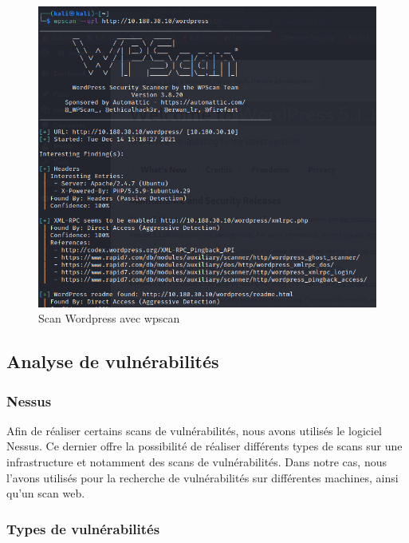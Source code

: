 \documentclass[french,paper=a4,oneside,captions=tableheading]{article}
\begin{document}
\begin{figure}[H]
    \centering
    \includegraphics[width=16cm]{images/wordpress-scan.png}
    \caption{Scan Wordpress avec wpscan}
    \label{fig:wordpress-scan}
\end{figure}












\subsection{Analyse de vulnérabilités}



\subsubsection{Nessus}

Afin de réaliser certains scans de vulnérabilités, nous avons utilisés le logiciel Nessus. Ce dernier offre la possibilité de réaliser différents types de scans sur une infrastructure et notamment des scans de vulnérabilités. Dans notre cas, nous l'avons utilisés pour la recherche de vulnérabilités sur différentes machines, ainsi qu'un scan web.



\subsubsection{Types de vulnérabilités}
\end{document}
